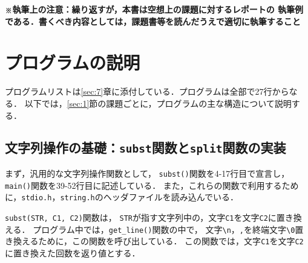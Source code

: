 \textbf{\small※執筆上の注意：繰り返すが，本書は空想上の課題に対するレポートの
    執筆例である．書くべき内容としては，課題書等を読んだうえで適切に執筆すること\\}


\section{プログラムの説明} \label{sec:3}

プログラムリストは\ref{sec:7}章に添付している．プログラムは全部で27行からなる．
以下では，\ref{sec:1}節の課題ごとに，プログラムの主な構造について説明する．

\subsection{文字列操作の基礎：\texttt{subst}関数と\texttt{split}関数の実装}

まず，汎用的な文字列操作関数として，
\verb|subst()|関数を4-17行目で宣言し， %
\verb|main()|関数を39-52行目に記述している．   %
また，これらの関数で利用するために，\verb|stdio.h|，\verb|string.h|のヘッダファイルを読み込んでいる．

\verb|subst(STR, C1, C2)|関数は，
\verb|STR|が指す文字列中の，文字\verb|C1|を文字\verb|C2|に置き換える．
プログラム中では，\verb|get_line()|関数の中で，
文字\verb|\n|，\verb|,|を終端文字\verb|\0|置き換えるために，この関数を呼び出している．
この関数では，文字\verb|C1|を文字\verb|C2|に置き換えた回数を返り値とする．

